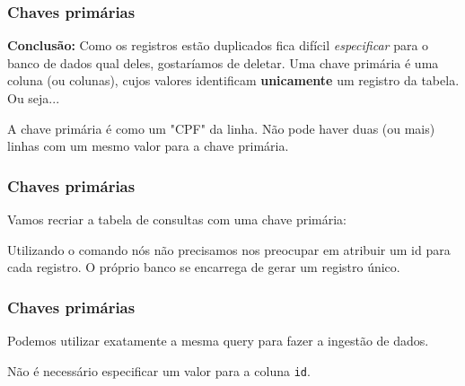 \documentclass[t, 10pt, aspectratio=169, table, x11names]{beamer}
\begin{document}
	\begin{frame}[t]
		\frametitle{Chaves primárias}
		\textbf{Conclusão:} Como os registros estão duplicados fica difícil \textit{especificar} para o banco de dados qual deles, gostaríamos de deletar.
			Uma chave primária é uma coluna (ou colunas), cujos valores identificam \textbf{unicamente} um registro da tabela.
		\reasonboxend
		\bigskip
		Ou seja...

		A chave primária é como um "CPF" da linha. Não pode haver duas (ou mais) linhas com um mesmo valor para a chave primária. 
	\end{frame}

	\begin{frame}[t]
		\frametitle{Chaves primárias}
		Vamos recriar a tabela de consultas com uma chave primária:
		\bigskip
		
		\bigskip
		Utilizando o comando  nós não precisamos nos preocupar em atribuir um id para cada registro. O próprio banco se encarrega de gerar um registro único.
	\end{frame}

	\begin{frame}
		\frametitle{Chaves primárias}
		Podemos utilizar exatamente a mesma query para fazer a ingestão de dados.

		Não é necessário especificar um valor para a coluna \texttt{id}.
		\bigskip
		
	\end{frame}
\end{document}
